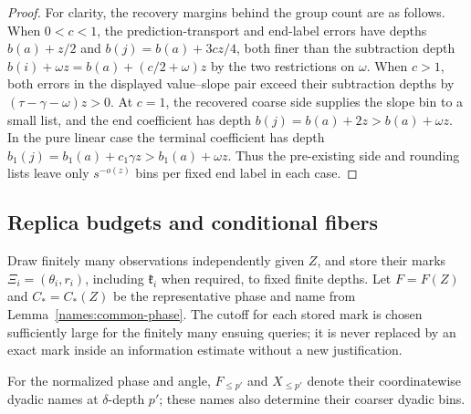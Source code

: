 \begin{proof}
For clarity, the recovery margins behind the group count are as
follows. When \(0<c<1\), the prediction-transport and end-label
errors have depths \(b(a)+z/2\) and
\(b(j)=b(a)+3cz/4\), both finer than the subtraction depth
\(b(i)+\omega z=b(a)+(c/2+\omega)z\) by the two restrictions on
\(\omega\). When \(c>1\), both errors in the displayed value--slope
pair exceed their subtraction depths by
\((\tau-\gamma-\omega)z>0\). At \(c=1\), the recovered coarse
side supplies the slope bin to a small list, and the end coefficient
has depth \(b(j)=b(a)+2z>b(a)+\omega z\). In the pure linear case
the terminal coefficient has depth
\(b_1(j)=b_1(a)+c_1\gamma z>b_1(a)+\omega z\).
Thus the pre-existing side and rounding lists leave only
\(s^{-o(z)}\) bins per fixed end label in each case.
\end{proof}

\subsection{Replica budgets and conditional fibers}

Draw finitely many observations independently given \(Z\), and
store their marks \(\Xi_i=(\theta_i,r_i)\), including
\(\mathfrak k_i\) when required, to fixed finite depths.
Let \(F=F(Z)\) and \(C_*=C_*(Z)\) be the representative phase
and name from Lemma~\ref{names:common-phase}. The cutoff for
each stored mark is chosen sufficiently large for the finitely
many ensuing queries; it is never replaced by an exact mark
inside an information estimate without a new justification.

For the normalized phase and angle, \(F_{\leq p'}\) and
\(X_{\leq p'}\) denote their coordinatewise dyadic names at
\(\delta\)-depth \(p'\); these names also determine their coarser
dyadic bins.

